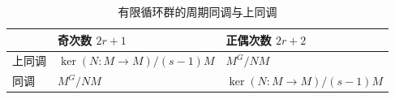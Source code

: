\begin{table}[htbp]
	\centering
	\caption{有限循环群的周期同调与上同调}
	\label{b4:tab:cyclic-group-periodic-cohomology}
	\begin{tabularx}{\textwidth}{@{}>{\raggedright\arraybackslash}p{}>{\centering\arraybackslash}X>{\centering\arraybackslash}X@{}}
		\toprule
		& 奇次数 \(2r+1\) & 正偶次数 \(2r+2\) \\
		\midrule
		上同调 & \(\ker(N:M\to M)/(s-1)M\) & \(M^G/NM\) \\
		同调 & \(M^G/NM\) & \(\ker(N:M\to M)/(s-1)M\) \\
		\bottomrule
	\end{tabularx}
\end{table}
